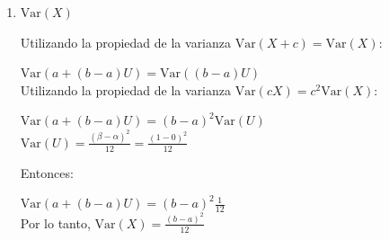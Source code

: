 \documentclass[11pt,a4paper]{report}
\begin{document}
\begin{enumerate}
{\begin{enumerate}
{					$\mathbb{E}(a+(b - a)U) = a + (b - a)\mathbb{E}(U)$\\

					$\mathbb{E}(U) = \frac{\beta + \alpha}{2} = \frac{1+0}{2}$

					Entonces:

					$\mathbb{E}(a+(b - a)U) = a + (b - a)\frac{1}{2} = \frac{1}{2}(a+b)$\\


					Por lo tanto, $\mathbb{E}(X) = \frac{a+b}{2}$\\


				}

				\item {
					$\text{Var}(X)$

					Utilizando la propiedad de la varianza $\text{Var}(X + c) = \text{Var}(X)$:

					$\text{Var}(a+(b - a)U) = \text{Var}((b - a)U)$\\

					Utilizando la propiedad de la varianza $\text{Var}(cX) = c^2\text{Var}(X)$:

					$\text{Var}(a+(b - a)U) = (b - a)^2 \text{Var}(U)$\\


					$\text{Var}(U) = \frac{(\beta - \alpha)^2}{12} = \frac{(1-0)^2}{12}$

					Entonces:

					$\text{Var}(a+(b - a)U) = (b - a)^2\frac{1}{12}$ \\


					Por lo tanto, $\text{Var}(X) = \frac{(b - a)^2}{12}$ \\
				}
			\end{enumerate}
			}
	\end{enumerate}
\end{document}
